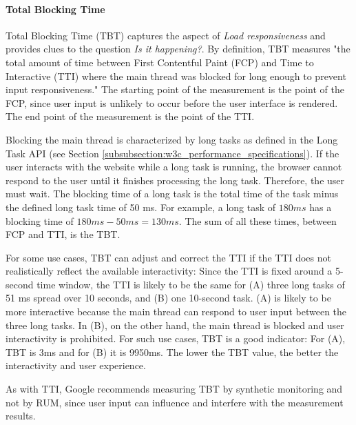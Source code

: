 
\paragraph{Total Blocking Time} %


Total Blocking Time (TBT) captures the aspect of \textit{Load responsiveness} and provides clues to the question \textit{Is it happening?}.
By definition, TBT measures "the total amount of time between First Contentful Paint (FCP) and Time to Interactive (TTI) where the main thread was blocked for long enough to prevent input responsiveness." %
The starting point of the measurement is the point of the FCP, since user input is unlikely to occur before the user interface is rendered.
The end point of the measurement is the point of the TTI.

Blocking the main thread is characterized by long tasks as defined in the Long Task API (see Section \ref{subsubsection:w3c_performance_specifications}).
If the user interacts with the website while a long task is running, the browser cannot respond to the user until it finishes processing the long task.
Therefore, the user must wait.
The blocking time of a long task is the total time of the task minus the defined long task time of 50 ms.
For example, a long task of $180ms$ has a blocking time of $180ms - 50ms = 130ms$.
The sum of all these times, between FCP and TTI, is the TBT.


For some use cases, TBT can adjust and correct the TTI if the TTI does not realistically reflect the available interactivity:
Since the TTI is fixed around a 5-second time window, the TTI is likely to be the same for (A) three long tasks of 51 ms spread over 10 seconds, and (B) one 10-second task.
(A) is likely to be more interactive because the main thread can respond to user input between the three long tasks.
In (B), on the other hand, the main thread is blocked and user interactivity is prohibited.
For such use cases, TBT is a good indicator:
For (A), TBT is 3ms and for (B) it is 9950ms.
The lower the TBT value, the better the interactivity and user experience.

As with TTI, Google recommends measuring TBT by synthetic monitoring and not by RUM, since user input can influence and interfere with the measurement results. \\


